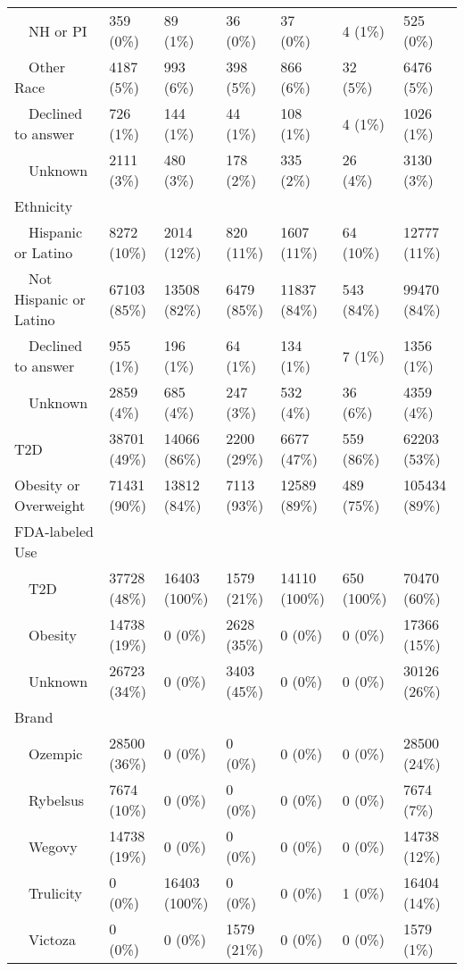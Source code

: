 \begin{longtable}{p{}p{}p{}p{}p{}p{}p{}}
    NH or PI & 359 (0\%) & 89 (1\%) & 36 (0\%) & 37 (0\%) & 4 (1\%) & 525 (0\%) \\ 
    Other Race & 4187 (5\%) & 993 (6\%) & 398 (5\%) & 866 (6\%) & 32 (5\%) & 6476 (5\%) \\ 
    Declined to answer & 726 (1\%) & 144 (1\%) & 44 (1\%) & 108 (1\%) & 4 (1\%) & 1026 (1\%) \\ 
    Unknown & 2111 (3\%) & 480 (3\%) & 178 (2\%) & 335 (2\%) & 26 (4\%) & 3130 (3\%) \\ 
  Ethnicity &  &  &  &  &  &  \\ 
    Hispanic or Latino & 8272 (10\%) & 2014 (12\%) & 820 (11\%) & 1607 (11\%) & 64 (10\%) & 12777 (11\%) \\ 
    Not Hispanic or Latino & 67103 (85\%) & 13508 (82\%) & 6479 (85\%) & 11837 (84\%) & 543 (84\%) & 99470 (84\%) \\ 
    Declined to answer & 955 (1\%) & 196 (1\%) & 64 (1\%) & 134 (1\%) & 7 (1\%) & 1356 (1\%) \\ 
    Unknown & 2859 (4\%) & 685 (4\%) & 247 (3\%) & 532 (4\%) & 36 (6\%) & 4359 (4\%) \\ 
  T2D & 38701 (49\%) & 14066 (86\%) & 2200 (29\%) & 6677 (47\%) & 559 (86\%) & 62203 (53\%) \\ 
  Obesity or Overweight & 71431 (90\%) & 13812 (84\%) & 7113 (93\%) & 12589 (89\%) & 489 (75\%) & 105434 (89\%) \\ 
  FDA-labeled Use &  &  &  &  &  &  \\ 
    T2D & 37728 (48\%) & 16403 (100\%) & 1579 (21\%) & 14110 (100\%) & 650 (100\%) & 70470 (60\%) \\ 
    Obesity & 14738 (19\%) & 0 (0\%) & 2628 (35\%) & 0 (0\%) & 0 (0\%) & 17366 (15\%) \\ 
    Unknown & 26723 (34\%) & 0 (0\%) & 3403 (45\%) & 0 (0\%) & 0 (0\%) & 30126 (26\%) \\ 
  Brand &  &  &  &  &  &  \\ 
    Ozempic & 28500 (36\%) & 0 (0\%) & 0 (0\%) & 0 (0\%) & 0 (0\%) & 28500 (24\%) \\ 
    Rybelsus & 7674 (10\%) & 0 (0\%) & 0 (0\%) & 0 (0\%) & 0 (0\%) & 7674 (7\%) \\ 
    Wegovy & 14738 (19\%) & 0 (0\%) & 0 (0\%) & 0 (0\%) & 0 (0\%) & 14738 (12\%) \\ 
    Trulicity & 0 (0\%) & 16403 (100\%) & 0 (0\%) & 0 (0\%) & 1 (0\%) & 16404 (14\%) \\ 
    Victoza & 0 (0\%) & 0 (0\%) & 1579 (21\%) & 0 (0\%) & 0 (0\%) & 1579 (1\%) \\ 

\end{longtable}
